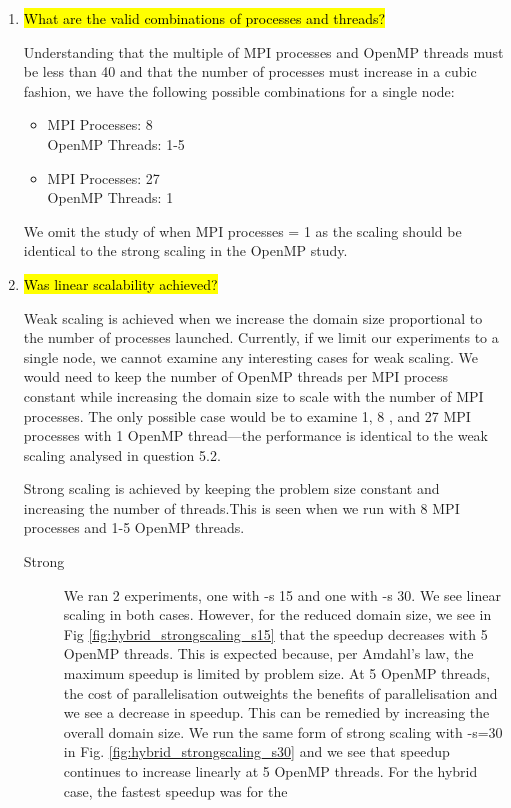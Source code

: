 \documentclass{article}
\begin{document}
\begin{enumerate}
	\item \hl{What are the valid combinations of processes and threads?}

	Understanding that the multiple of MPI processes and OpenMP threads must be less than 40 and that the number of processes must increase in a cubic fashion, we have the following possible combinations for a single node:
	\begin{itemize}
		\item   MPI Processes: 8\\
				OpenMP Threads: 1-5
		\item	MPI Processes: 27\\
				OpenMP Threads: 1
	\end{itemize}
	
	We omit the study of when MPI processes = 1 as the scaling should be identical to the strong scaling in the OpenMP study.
	
	\item \hl{Was linear scalability achieved?}
	
	Weak scaling is achieved when we increase the domain size proportional to the number of processes launched. Currently, if we limit our experiments to a single node, we cannot examine any interesting cases for weak scaling. We would need to keep the number of OpenMP threads per MPI process constant while increasing the domain size to scale with the number of MPI processes. The only possible case would be to examine 1, 8 , and 27 MPI processes with 1 OpenMP thread---the performance is identical to the weak scaling analysed in question 5.2.
	
	Strong scaling is achieved by keeping the problem size constant and increasing the number of threads.This is seen when we run with 8 MPI processes and 1-5 OpenMP threads. 
	
	\begin{description}
		\item[Strong] We ran 2 experiments, one with -s 15 and one with -s 30. We see linear scaling in both cases. However, for the reduced domain size, we see in Fig \ref{fig:hybrid_strongscaling_s15} that the speedup decreases with 5 OpenMP threads. This is expected because, per Amdahl's law, the maximum speedup is limited by problem size. At 5 OpenMP threads, the cost of parallelisation outweights the benefits of parallelisation and we see a decrease in speedup. This can be remedied by increasing the overall domain size. We run the same form of strong scaling with -s=30 in Fig. \ref{fig:hybrid_strongscaling_s30} and we see that speedup continues to increase linearly at 5 OpenMP threads. For the hybrid case, the fastest speedup was for the 
	\end{description}
		

\end{enumerate}
\end{document}
